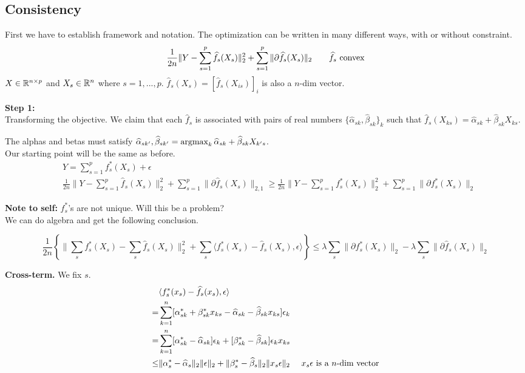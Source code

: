\documentclass{article}
\begin{document}
\subsection{Consistency}

First we have to establish framework and notation. The optimization can be written in many different ways, with or without constraint. 
\[
\frac{1}{2n} \| Y - \sum_{s=1}^p \widehat{f}_s(X_s) \|_2^2 + \sum_{s=1}^p \| \partial \widehat{f}_s(X_s)\|_2 \qquad \widehat{f}_s \textrm{ convex}
\]
$X \in \mathbb{R}^{n\times p}$ and $X_s \in \mathbb{R}^n$ where $s = 1,...,p$. $\hat{f}_s(X_s) = [ \hat{f}_s(X_{is}) ]_i$ is also a $n$-dim vector.

\textbf{Step 1:}\\

Transforming the objective. We claim that each $\hat{f}_s$ is associated with pairs of real numbers $\{ \hat{\alpha}_{s k}, \hat{\beta}_{s k} \}_k$ such that $\hat{f}_s(X_{ks}) = \hat{\alpha}_{s k} + \hat{\beta}_{s k} X_{ks}$.

The alphas and betas must satisfy $\hat{\alpha}_{s k'}, \hat{\beta}_{s k'} = \argmax_k \hat{\alpha}_{s k} + \hat{\beta}_{s k} X_{k' s}$.\\

Our starting point will be the same as before. 
\begin{align*}
& Y = \sum_{s=1}^p f^*_s(X_s) + \epsilon \\
& \frac{1}{2n} \| Y - \sum_{s=1}^p \hat{f}_s(X_s) \|_2^2 + \sum_{s=1}^p \| \partial \hat{f}_s(X_s)\|_{2,1} \geq \frac{1}{2n} \| Y - \sum_{s=1}^p f^*_s(X_s) \|_2^2 + \sum_{s=1}^p \| \partial f^*_s(X_s)\|_2
\end{align*}

\textbf{Note to self:} $f^*_s$'s are not unique. Will this be a problem?\\

We can do algebra and get the following conclusion.

\[
\frac{1}{2n} \left\{ \| \sum_s f^*_s(X_s) - \sum_s \hat{f}_s(X_s) \|_2^2 + \sum_s \langle f^*_s(X_s) - \hat{f}_s(X_s), \epsilon \rangle \right\} \leq \lambda \sum_s \| \partial f^*_s(X_s)\|_2 - \lambda  \sum_s \| \partial \hat{f}_s(X_s)\|_2 
\]

\textbf{Cross-term.} We fix $s$. 
\begin{align*}
& \langle f^*_s(x_s) - \widehat{f}_s(x_s), \epsilon \rangle \\
=& \sum_{k=1}^n [ \alpha^*_{sk} + \beta^*_{sk} x_{ks} - \widehat{\alpha}_{sk} - \widehat{\beta}_{sk} x_{ks} ] \epsilon_k \\
=& \sum_{k=1}^n [\alpha^*_{sk} - \widehat{\alpha}_{sk}] \epsilon_k + [\beta^*_{sk} - \widehat{\beta}_{sk}] \epsilon_k x_{ks} \\
\leq & \| \alpha^*_s - \widehat{\alpha}_s \|_2 \| \epsilon \|_2 + \| \beta^*_s - \widehat{\beta}_s \|_2 \| x_s \epsilon \|_2 \quad \textrm{ $x_s \epsilon$ is a $n$-dim vector}
\end{align*}
\end{document}
